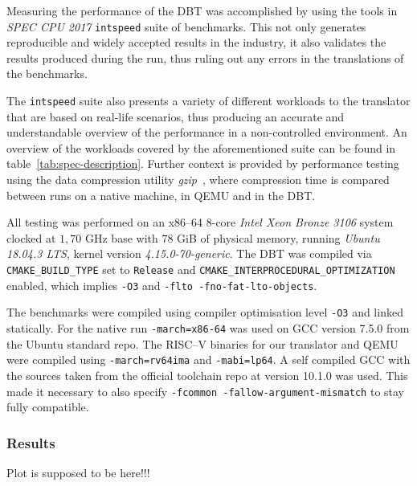 Measuring the performance of the DBT was accomplished by using the tools in \textit{SPEC CPU 2017} \texttt{intspeed} suite of benchmarks.
This not only generates reproducible and widely accepted results in the industry, it also validates the results produced during the run, thus ruling out any errors in the translations of the benchmarks.

The \texttt{intspeed} suite also presents a variety of different workloads to the translator that are based on real-life scenarios, thus producing an accurate and understandable overview of the performance in a non-controlled environment. %
An overview of the workloads covered by the aforementioned suite can be found in table~\ref{tab:spec-description}.
Further context is provided by performance testing using the data compression utility \textit{gzip}~\cite{gzip}, where compression time is compared between runs on a native machine, in QEMU and in the DBT\@.

All testing was performed on an x86--64 8-core \textit{Intel Xeon Bronze 3106} system clocked at $1,70$ GHz base with $78$ GiB of physical memory, running \textit{Ubuntu 18.04.3 LTS}, kernel version \textit{4.15.0-70-generic}.
The DBT was compiled via \texttt{CMAKE\_BUILD\_TYPE} set to \texttt{Release} and \texttt{CMAKE\_INTERPROCEDURAL\_OPTIMIZATION} enabled, which implies \texttt{-O3} and \texttt{-flto -fno-fat-lto-objects}.

The benchmarks were compiled using compiler optimisation level \texttt{-O3} and linked statically.
For the native run \texttt{-march=x86-64} was used on GCC version 7.5.0 from the Ubuntu standard repo.
The RISC--V binaries for our translator and QEMU were compiled using \texttt{-march=rv64ima} and \texttt{-mabi=lp64}.
A self compiled GCC with the sources taken from the official toolchain repo at version 10.1.0 was used.
This made it necessary to also specify \texttt{-fcommon -fallow-argument-mismatch} to stay fully compatible.

\subsubsection{Results}
{\color{red} Plot is supposed to be here!!!}

